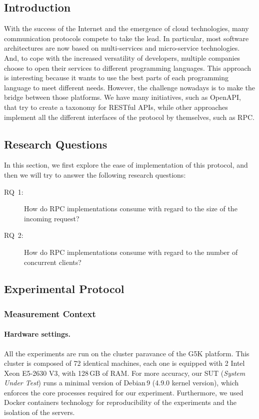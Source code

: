 \subsection{Introduction}
With the success of the Internet and the emergence of cloud technologies, many communication protocols compete to take the lead.
In particular, most software architectures are now based on multi-services and micro-service technologies.
And, to cope with the increased versatility of developers, multiple companies choose to open their services to different programming languages.
This approach is interesting because it wants to use the best parts of each programming language to meet different needs.
However, the challenge nowadays is to make the bridge between those platforms.
We have many initiatives, such as OpenAPI, that try to create a taxonomy for RESTful APIs, while other approaches implement all the different interfaces of the protocol by themselves, such as RPC.

\subsection{Research Questions}
In this section, we first explore the ease of implementation of this protocol, and then we will try to answer the following research questions:
\begin{description}
    \item[\textsc{RQ}~1:] How do RPC implementations consume with regard to the size of the incoming request?
    \item[\textsc{RQ}~2:] How do RPC implementations consume with regard to the number of concurrent clients?
\end{description}

\subsection{Experimental Protocol}
\subsubsection{Measurement Context}
\paragraph{Hardware settings.}
All the experiments are run on the cluster \textsf{paravance} of the G5K platform.
This cluster is composed of 72 identical machines, each one is equipped with 2 Intel Xeon E5-2630 V3, with 128\,GB of RAM.
For more accuracy, our SUT (\emph{System Under Test}) runs a minimal version of Debian\,9 (4.9.0 kernel version), which enforces the core processes required for our experiment.
Furthermore, we used Docker containers technology for reproducibility of the experiments and the isolation of the servers.

